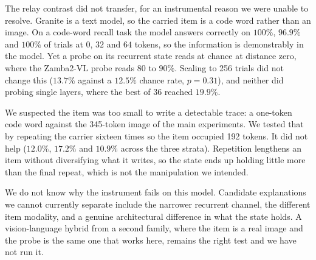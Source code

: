 The relay contrast did not transfer, for an instrumental reason we were unable
to resolve. Granite is a text model, so the carried item is a code word rather
than an image. On a code-word recall task the model answers correctly on
$100\%$, $96.9\%$ and $100\%$ of trials at $0$, $32$ and $64$ tokens, so the
information is demonstrably in the model. Yet a probe on its recurrent state
reads at chance at distance zero, where the Zamba2-VL probe reads $80$ to
$90\%$. Scaling to 256 trials did not change this ($13.7\%$ against a $12.5\%$
chance rate, $p = 0.31$), and neither did probing single layers, where the best
of 36 reached $19.9\%$.

We suspected the item was too small to write a detectable trace: a one-token
code word against the 345-token image of the main experiments. We tested that by
repeating the carrier sixteen times so the item occupied 192 tokens. It did not
help ($12.0\%$, $17.2\%$ and $10.9\%$ across the three strata). Repetition
lengthens an item without diversifying what it writes, so the state ends up
holding little more than the final repeat, which is not the manipulation we
intended.

We do not know why the instrument fails on this model. Candidate explanations
we cannot currently separate include the narrower recurrent channel, the
different item modality, and a genuine architectural difference in what the
state holds. A vision-language hybrid from a second family, where the item is
a real image and the probe is the same one that works here, remains the right
test and we have not run it.
